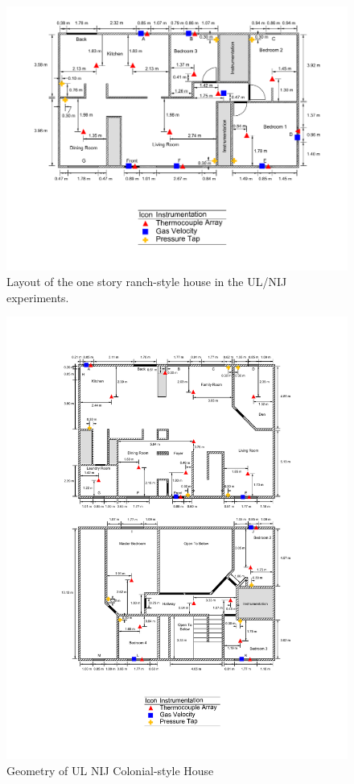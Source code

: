 \begin{figure}[p]
\includegraphics[width=\textwidth]{FIGURES/UL_NIJ_Houses/UL_NIJ_Ranch_layout}
\caption[Layout of the one story ranch-style house in the UL/NIJ experiments]{Layout of the one story ranch-style house in the UL/NIJ experiments.}
\label{Ranch_layout}
\end{figure}

\begin{figure}[p]
\includegraphics[width=\textwidth]{FIGURES/UL_NIJ_Houses/UL_NIJ_Colonial_layout}
\caption{Geometry of UL NIJ Colonial-style House}
\label{Colonial_layout}
\end{figure}

